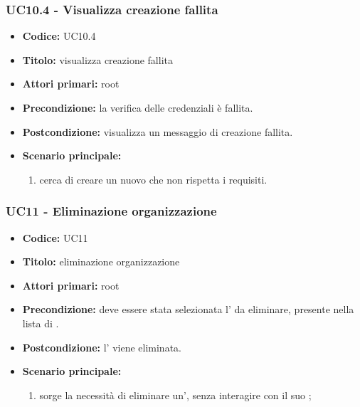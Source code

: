 \documentclass[casi-duso]{subfiles}
\begin{document}
\subsubsection{UC10.4 - Visualizza creazione fallita}
\label{subsub:UC10.4}
\begin{itemize}
  \item \textbf{Codice:} UC10.4
  \item \textbf{Titolo:} visualizza creazione fallita
  \item \textbf{Attori primari:} root
  \item \textbf{Precondizione:} la verifica delle credenziali è fallita.
  \item \textbf{Postcondizione:}  visualizza un messaggio di creazione fallita.
  \item \textbf{Scenario principale:} 
  \begin{enumerate}
    \item {} cerca di creare un nuovo  che non rispetta i requisiti.
  \end{enumerate}
\end{itemize}

\subsubsection{UC11 - Eliminazione organizzazione}
\label{subsub:UC11}
\begin{itemize}
  \item \textbf{Codice:} UC11
  \item \textbf{Titolo:} eliminazione organizzazione
  \item \textbf{Attori primari:} root
  \item \textbf{Precondizione:} deve essere stata selezionata l' da eliminare, presente nella lista di .
  \item \textbf{Postcondizione:} l' viene eliminata.
  \item \textbf{Scenario principale:} 
  \begin{enumerate}
    \item sorge la necessità di eliminare un', senza interagire con il suo ;
  \end{enumerate}
\end{itemize}
\end{document}
